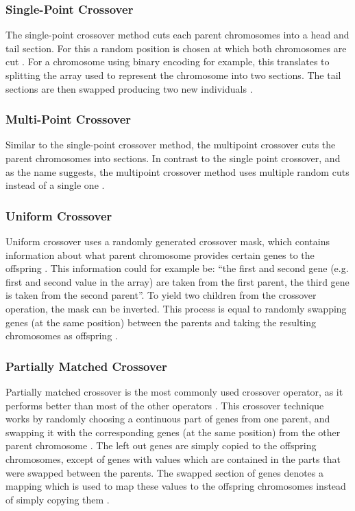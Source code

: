 \documentclass[sigconf]{acmart}
\begin{document}
\subsubsection{Single-Point Crossover}
The single-point crossover method cuts each parent chromosomes into a head and
tail section. For this a random position is chosen at which both chromosomes
are cut \cite{Affenzeller2009}.
For a chromosome using binary encoding for example, this translates to
splitting the array used to represent the chromosome into two sections.
The tail sections are then swapped producing two new individuals
\cite{Affenzeller2009}.

\subsubsection{Multi-Point Crossover}
Similar to the single-point crossover method, the multipoint crossover
cuts the parent chromosomes into sections. In contrast to the single point
crossover, and as the name suggests, the multipoint crossover method
uses multiple random cuts instead of a single one
\cite{Affenzeller2009,Katoch2021}. 

\subsubsection{Uniform Crossover}
Uniform crossover uses a randomly generated crossover mask, which contains
information about what parent chromosome provides certain genes to the
offspring \cite{Affenzeller2009}. This information could for example be:
\enquote{the first and second gene (e.g. first and second value in the array)
are taken from the first parent, the third gene is taken from the second
parent}.
To yield two children from the crossover operation, the mask can be inverted.
This process is equal to randomly swapping genes (at the same position) between
the parents and taking the resulting chromosomes as offspring \cite{Katoch2021}.


\subsubsection{Partially Matched Crossover}
Partially matched crossover is the most commonly used crossover operator,
as it performs better than most of the other operators \cite{Katoch2021}.
This crossover technique works by randomly choosing a continuous part of genes
from one parent, and swapping it with the corresponding genes (at the same
position) from the other parent chromosome \cite{Katoch2021}.
The left out genes are simply copied to the offspring chromosomes, except of
genes with values which are contained in the parts that were swapped between
the parents. The swapped section of genes denotes a mapping which is used to
map these values to the offspring chromosomes instead of simply copying them
\cite{Katoch2021}.
\end{document}
